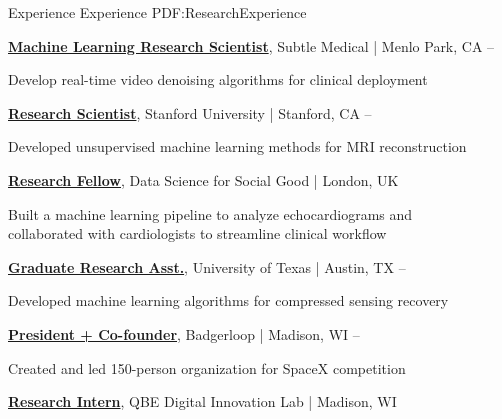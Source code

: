 \Section
{Experience}
{Experience}
{PDF:ResearchExperience}

\Entry\href{}
{\textbf{Machine Learning Research Scientist}},
Subtle Medical | Menlo Park, CA\hfill
{} --  %
\begin{Detail}
\BulletItem
Develop real-time video denoising algorithms for clinical deployment
\end{Detail}

\BigGap\Entry\href{}
{\textbf{Research Scientist}},
Stanford University | Stanford, CA\hfill
{} -- 
\begin{Detail}
\BulletItem
Developed unsupervised machine learning methods for MRI reconstruction
\end{Detail}

\BigGap\Entry\href{}
{\textbf{Research Fellow}},
Data Science for Social Good | London, UK\hfill
{}
\begin{Detail}
\BulletItem
Built a machine learning pipeline to analyze echocardiograms and \\ collaborated with cardiologists to streamline clinical workflow 
\end{Detail}

\BigGap\Entry\href{}
{\textbf{Graduate Research Asst.}},
University of Texas | Austin, TX\hfill
{} -- 
\begin{Detail}
\BulletItem
Developed machine learning algorithms for compressed sensing recovery 
\end{Detail}

\BigGap\Entry\href{}
{\textbf{President + Co-founder}},
Badgerloop | Madison, WI\hfill
{} -- 
\begin{Detail}
\BulletItem
Created and led 150-person organization for SpaceX competition
\end{Detail}

\BigGap\Entry\href{}
{\textbf{Research Intern}},
QBE Digital Innovation Lab | Madison, WI\hfill
{}

